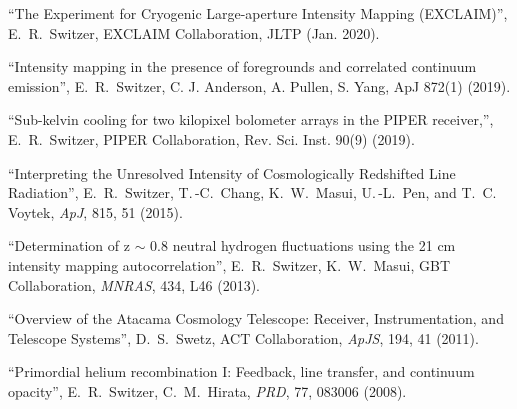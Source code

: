 \item ``The Experiment for Cryogenic Large-aperture Intensity Mapping (EXCLAIM)'', E.\ R.\ Switzer, EXCLAIM Collaboration, JLTP (Jan. 2020).
\item ``Intensity mapping in the presence of foregrounds and correlated continuum emission'', E.\, R.\, Switzer, C. J. Anderson, A. Pullen, S. Yang, ApJ 872(1) (2019).
\item ``Sub-kelvin cooling for two kilopixel bolometer arrays in the PIPER receiver,'', E.\ R.\ Switzer, PIPER Collaboration, Rev. Sci. Inst. 90(9) (2019).
\item ``Interpreting the Unresolved Intensity of Cosmologically Redshifted Line Radiation'', E.\, R.\, Switzer, T.\,-C.\, Chang, K.\, W.\, Masui, U.\,-L.\, Pen, and T.\, C.\, Voytek, {\it ApJ}, 815, 51 (2015).
\item ``Determination of z $\sim$ 0.8 neutral hydrogen fluctuations using the 21 cm intensity mapping autocorrelation'', E.\, R.\, Switzer, K.\, W.\, Masui, GBT Collaboration, {\it MNRAS}, 434, L46 (2013).
\item ``Overview of the Atacama Cosmology Telescope: Receiver, Instrumentation, and Telescope Systems'', D.\, S.\, Swetz, ACT Collaboration, {\it ApJS}, 194, 41 (2011).
\item ``Primordial helium recombination I: Feedback, line transfer, and continuum opacity'', E.\, R.\, Switzer, C.\, M.\, Hirata, {\it PRD}, 77, 083006 (2008).
